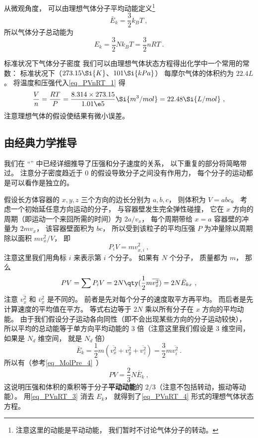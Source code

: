 从微观角度，  可以由理想气体分子平均动能定义\footnote{注意这里的动能是平动动能， 我们暂时不讨论气体分子的转动。}
\begin{equation}\label{eq_PVnRT_3}
\bar E_k = \frac32 k_B T~,
\end{equation}
所以气体分子总动能为
\begin{equation}\label{eq_PVnRT_5}
E_k = \frac32 Nk_B T = \frac{3}{2}nRT~.
\end{equation}

\begin{example}{标准状况下气体分子密度}
我们可以由理想气体状态方程得出化学中一个常用的常数： 标准状况下（$273.15 \Si{K}$、$101 \Si{kPa}$） 每摩尔气体的体积约为 $22.4L$。 将温度和压强代入\autoref{eq_PVnRT_1} 得
\begin{equation}
\frac{V}{n} = \frac{RT}{P} = \frac{8.314 \times 273.15}{1.01\e5}\Si{m^3/mol} = 22.48 \Si{L/mol}~,
\end{equation}
注意理想气体的假设使结果有微小误差。
\end{example}

\subsection{由经典力学推导}

我们在 “” 中已经详细推导了压强和分子速度的关系， 以下重复的部分将简略带过。 注意分子密度趋近于 0 的假设导致分子之间没有作用力， 每个分子的运动都是可以看作是独立的。

假设长方体容器的 $x, y, z$ 三个方向的边长分别为 $a, b, c$， 则体积为  $V = abc$。 考虑一个初始延任意方向运动的分子， 与容器壁发生完全弹性碰撞， 它在 $x$ 方向的周期（即运动一个来回所需的时间）为 $2a/v_x$， 每个周期带给 $x = a$ 容器壁的冲量为 $2m v_x$， 该容器壁面积为 $bc$， 所以受到该粒子的平均压强 $P$ 为冲量除以周期除以面积 $mv_x^2/V$， 即
\begin{equation}
P_i V = mv_{x,i}^2~,
\end{equation}
注意这里我们用角标 $i$ 来表示第 $i$ 个分子。 如果有 $N$ 个分子， 质量都为 $m$， 那么
\begin{equation}
P V = \sum P_i V = 2 N \qty(\frac12 m \overline {v_x^2}) = 2 N \bar E_{kx}~,
\end{equation}
注意 $\overline {v_x^2}$ 和 $\bar v_x^2$ 是不同的。 前者是先对每个分子的速度取平方再平均。 而后者是先计算速度的平均值在平方。 等式右边等于 $2N$ 乘以所有分子在 $x$ 方向的平均动能。 由于我们假设分子运动各向同性（即不会出现某些方向的分子运动较快）， 所以平均的总动能等于单方向平均动能的 3 倍（注意这里我们假设是 3 维空间， 如果是 $N_d$ 维空间， 就是 $N_d$ 倍）
\begin{equation}
\bar E_k = \frac{1}{2} m (\overline {v_x^2} + \overline {v_y^2} + \overline {v_z^2}) = \frac{3}{2} m \overline {v_i^2}~.
\end{equation}
所以有（参考\autoref{eq_MolPre_4}~）
\begin{equation}\label{eq_PVnRT_6}
P V = \frac23 N \bar E_k~,
\end{equation}
这说明压强和体积的乘积等于分子\textbf{平动动能}的 $2/3$（注意不包括转动，振动等动能）。 用\autoref{eq_PVnRT_3} 消去 $E_k$， 就得到了\autoref{eq_PVnRT_4} 形式的理想气体状态方程。

